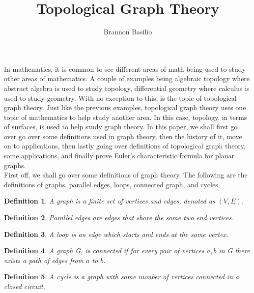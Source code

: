 \documentclass[12pt]{article}
\newtheorem{mydef}{Definition}
\newcommand{\tab}{\hspace{10mm}}
\theoremstyle{definition}
\theoremstyle{remark}
\begin{document}
\title{Topological Graph Theory} %
\author{Brannon Basilio} %
\date{} %
\maketitle




\tab In mathematics, it is common to see different areas of math being used to study other areas of mathematics.
%
A couple of examples being algebraic topology where abstract algebra is used to study topology, differential geometry where calculus is used to study geometry.
%
With no exception to this, is the topic of topological graph theory.
%
Just like the previous examples, topological graph theory uses one topic of mathematics to help study another area.
%
In this case, topology, in terms of surfaces, is used to help study graph theory.
%
In this paper, we shall first go over go over some definitions used in graph theory, then the history of it, move on to applications, then lastly going over definitions of topological graph theory, some applications, and finally prove Euler's characteristic formula for planar graphs.\\
%
%
%

\tab First off, we shall go over some definitions of graph theory. The following are the definitions of graphs, parallel edges, loops, connected graph, and cycles.

\begin{mydef}
A graph is a finite set of vertices and edges, denoted as $(V, E)$.
\end{mydef}

\begin{mydef}
Parallel edges are edges that share the same two end vertices.
\end{mydef}

\begin{mydef}
A loop is an edge which starts and ends at the same vertex.
\end{mydef}

\begin{mydef}
A graph G, is connected if for every pair of vertices $a, b$ in G there exists a path of edges from $a$ to $b$.
\end{mydef}

\begin{mydef}
A cycle is a graph with some number of vertices connected in a closed circuit.
\end{mydef}
\end{document}
